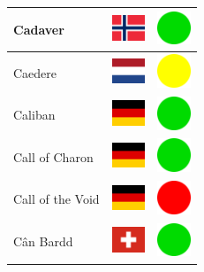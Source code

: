 \documentclass[12pt, a4paper, twoside]{report}
\begin{document}
\begin{center}
\begin{longtable}{|p{5cm}|p{2cm}|p{2cm}|}
 Cadaver                                                    & \includegraphics[width=1cm]{../img/flags/no} &   \includegraphics[width=1cm]{../likes/y} \\ \hline
 Caedere                                                    & \includegraphics[width=1cm]{../img/flags/nl} &   \includegraphics[width=1cm]{../likes/m} \\ \hline
 Caliban                                                    & \includegraphics[width=1cm]{../img/flags/de} &   \includegraphics[width=1cm]{../likes/y} \\ \hline
 Call of Charon                                             & \includegraphics[width=1cm]{../img/flags/de} &   \includegraphics[width=1cm]{../likes/y} \\ \hline
 Call of the Void                                           & \includegraphics[width=1cm]{../img/flags/de} &   \includegraphics[width=1cm]{../likes/n} \\ \hline
 Cân Bardd                                                  & \includegraphics[width=1cm]{../img/flags/ch} &   \includegraphics[width=1cm]{../likes/y} \\ \hline

\end{longtable}
\end{center}
\end{document}
